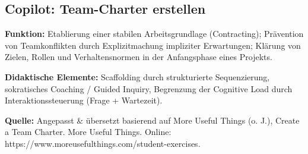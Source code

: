 \documentclass[
  ngerman,
  letterpaper,
  DIV=11]{scrreprt}
\begin{document}
\subsection{Copilot: Team-Charter
erstellen}\label{sec-prompt-team-charter}

\textbf{Funktion:} Etablierung einer stabilen Arbeitsgrundlage
(Contracting); Prävention von Teamkonflikten durch Explizitmachung
impliziter Erwartungen; Klärung von Zielen, Rollen und Verhaltensnormen
in der Anfangsphase eines Projekts.

\textbf{Didaktische Elemente:} Scaffolding durch strukturierte
Sequenzierung, sokratisches Coaching / Guided Inquiry, Begrenzung der
Cognitive Load durch Interaktionssteuerung (Frage + Wartezeit).

\textbf{Quelle:} Angepasst \& übersetzt basierend auf More Useful Things
(o. J.), Create a Team Charter. More Useful Things. Online:
https://www.moreusefulthings.com/student-exercises.
\end{document}
